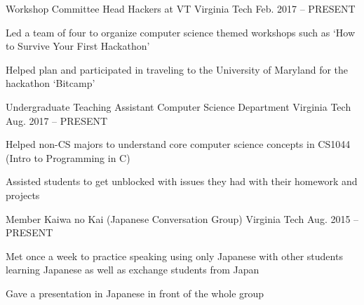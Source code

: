 

\begin{cventries}

  \cventry
    {Workshop Committee Head} %
    {Hackers at VT} %
    {Virginia Tech} %
    {Feb. 2017 – PRESENT} %
    {
      \begin{cvitems} %
        \item {Led a team of four to organize computer science themed workshops such as `How to Survive Your First Hackathon'}
        \item {Helped plan and participated in traveling to the University of Maryland for the hackathon `Bitcamp'}
      \end{cvitems}
    }

  \cventry
    {Undergraduate Teaching Assistant} %
    {Computer Science Department} %
    {Virginia Tech} %
    {Aug. 2017 – PRESENT} %
    {
      \begin{cvitems} %
        \item {Helped non-CS majors to understand core computer science concepts in CS1044 (Intro to Programming in C)}
        \item {Assisted students to get unblocked with issues they had with their homework and projects}
      \end{cvitems}
    }

  \cventry
    {Member} %
    {Kaiwa no Kai (Japanese Conversation Group)} %
    {Virginia Tech} %
    {Aug. 2015 – PRESENT} %
    {
      \begin{cvitems} %
        \item {Met once a week to practice speaking using only Japanese with other students learning Japanese as well as exchange students from Japan}
        \item {Gave a presentation in Japanese in front of the whole group}
      \end{cvitems}
    }

\end{cventries}
